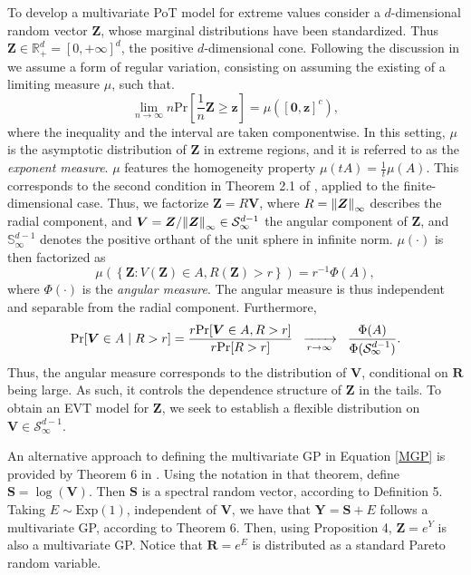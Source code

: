 To develop a multivariate PoT model for extreme values consider a $d$-dimensional random vector $\bm{Z}$, whose marginal distributions have been standardized. Thus $\bm{Z} \in {\mathbb R}^d_+ = [0,+\infty]^d$, the positive $d$-dimensional cone. Following the discussion in \cite{goix2017} we assume a form of regular variation, consisting on assuming the existing of a limiting measure $\mu$, such that.
\[
    \lim\limits_{n\to\infty}n\text{Pr}\left[\frac{1}{n}\bm{Z}\geq \bm{z}\right] = \mu\left([\bm{0},\bm{z}]^c\right),
\]
where the inequality and the interval are taken componentwise. 
In this setting, $\mu$ is the asymptotic distribution of $\bm{Z}$ in extreme regions, and it is referred to as the
  \emph{exponent measure}.  $\mu$ features the homogeneity property $\mu(tA) = \frac{1}{t}\mu(A)$. This
corresponds to the second condition in Theorem 2.1 of
\cite{ferreira2014}, applied to the finite-dimensional case.
Thus, we factorize $\bm{Z} =  R\bm{V}$, where
  $R = \pnorm{\bm{Z}}{\infty} $ describes the radial component, and
  $\bm{V} = \bm{Z}/\pnorm{\bm{Z}}{\infty} \in \mathcal{S}_{\infty}^{d-1}$ the angular component of
  $\bm{Z}$,  and ${\mathbb S}_\infty^{d-1}$ denotes the positive
orthant of the unit sphere in infinite
norm.  $\mu(\cdot)$ is then factorized as
\[
    \mu\left( \left\lbrace\bm{Z} : V(\bm{Z}) \in A , R(\bm{Z}) > r\right\rbrace \right) = r^{-1}\Phi(A),
\]
  where $\Phi(\cdot)$ is the \emph{angular measure}.  The angular measure is thus independent and
  separable from the radial component.  Furthermore,
\begin{equation} \label{MGP}
    \text{Pr}\left[\bm{V} \in A \mid R > r\right]
      = \frac{r\text{Pr}\left[\bm{V} \in A, R > r\right]}{r\text{Pr}[R > r]}\hspace{0.2cm}
      \xrightarrow[r\to\infty]{~} \hspace{0.2cm} \frac{\Phi(A)}{\Phi(\mathcal{S}_{\infty}^{d-1})}.
\end{equation}
  Thus, the angular measure corresponds to the distribution of $\bm{V}$, conditional on $\bm{R}$ being large.
  As such, it controls the dependence structure of $\bm{Z}$ in the tails. To obtain an EVT model for $\bm{Z}$, we seek to establish a flexible distribution on $\bm{V} \in \mathcal{S}_{\infty}^{d-1}$.

An alternative approach to defining the multivariate GP in Equation \eqref{MGP} is provided by Theorem 6 in \cite{RoSeWa2018a}. Using the notation in that theorem, define $\bm{S} = \log(\bm{V})$. Then $\bm{S}$ is a spectral random vector, according to Definition 5. Taking $E \sim \text{Exp}(1)$, independent of $\bm{V}$, we have that $\bm{Y} = \bm{S} + E$ follows a multivariate GP, according to Theorem 6.  Then, using Proposition 4, $\bm{Z} = e^{Y}$ is also a multivariate GP. Notice that $\bm{R} = e^E$ is distributed as a standard Pareto random variable.

